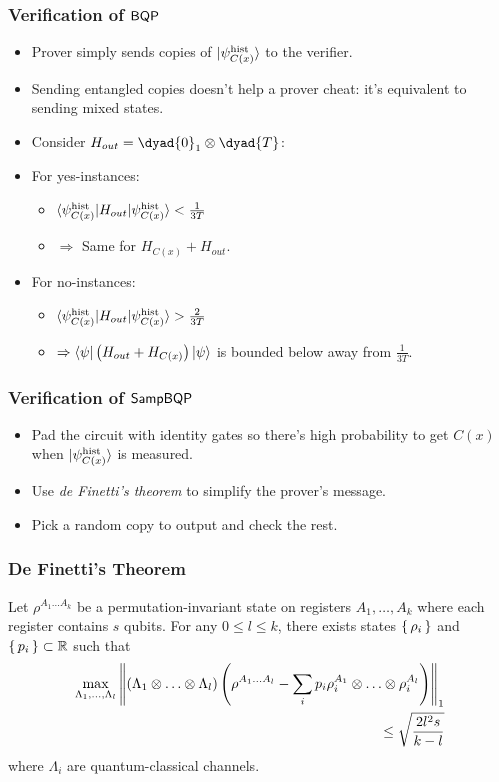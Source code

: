 \documentclass{beamer}
\begin{document}
\begin{frame}
	\frametitle{Verification of $\operatorname{\mathsf{BQP}}$}
	\begin{itemize}[<+->]
		\item Prover simply sends copies of $\ket{\psi_{C(x)}^{\mathrm{hist}}}$ to the verifier.
		\item Sending entangled copies doesn't help a prover cheat: it's equivalent to sending mixed states.
		\item Consider $H_{out}=\dyad{0}_1\otimes\dyad{T}$:
		\item For yes-instances:
			\begin{itemize}[<+->]
				\item $\braket{\psi_{C(x)}^{\mathrm{hist}}|H_{out}|\psi_{C(x)}^{\mathrm{hist}}}<\frac{1}{3T}$
				\item $\Rightarrow$ Same for $H_{C(x)}+H_{out}$.
			\end{itemize}
		\item For no-instances:
			\begin{itemize}[<+->]
				\item $\braket{\psi_{C(x)}^{\mathrm{hist}}|H_{out}|\psi_{C(x)}^{\mathrm{hist}}}>\frac{2}{3T}$
				\item $\Rightarrow\braket{\psi|\left(H_{out}+H_{C(x)}\right)|\psi}$ is bounded below away from $\frac{1}{3T}$.
			\end{itemize}
	\end{itemize}
\end{frame}

\begin{frame}
	\frametitle{Verification of $\operatorname{\mathsf{SampBQP}}$}
	\begin{itemize}[<+->]
		\item Pad the circuit with identity gates so there's high probability to get $C(x)$ when $\ket{\psi_{C(x)}^{\mathrm{hist}}}$ is measured.
		\item Use \emph{de Finetti's theorem} to simplify the prover's message.
		\item Pick a random copy to output and check the rest.
	\end{itemize}
\end{frame}

\begin{frame}
	\frametitle{De Finetti's Theorem}
	\begin{theorem}
		\label{deFinetti}
		Let $\rho^{A_1\ldots A_k}$ be a permutation-invariant state on registers $A_1,\ldots,A_k$ where each register contains $s$ qubits.
		For any $0\leq l\leq k$,  there exists states $\set{\rho_i}$ and $\set{p_i}\subset\mathbb{R}$ such that
		\begin{align*}
			\max_{\Lambda_1,\ldots,\Lambda_l}
			\left\lVert (\Lambda_1\otimes\ldots\otimes\Lambda_l)\left(\rho^{A_1\ldots A_l}-\sum_ip_i\rho_i^{A_1}\otimes\ldots\otimes\rho_i^{A_l}\right)\right\rVert_1 \\
			\leq\sqrt{\frac{2l^2s}{k-l}}
		\end{align*}
		where $\Lambda_i$ are quantum-classical channels.
	\end{theorem}
\end{frame}
\end{document}

